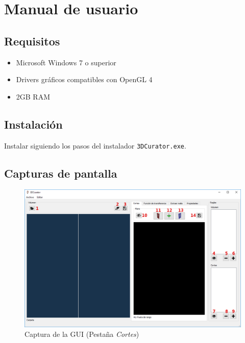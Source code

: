 \chapter{Manual de usuario}

\section{Requisitos}

\begin{itemize}
	\item Microsoft Windows 7 o superior
	\item Drivers gráficos compatibles con OpenGL 4
	\item 2GB RAM
\end{itemize}

\section{Instalación}

Instalar siguiendo los pasos del instalador \texttt{3DCurator.exe}.

\section{Capturas de pantalla}

\begin{figure}[H]
	\centering
	\includegraphics[width=12.5cm]{imagenes/gui_1}
	\caption{Captura de la GUI (Pestaña \textit{Cortes})}
	\label{fig:gui_1}
\end{figure}

